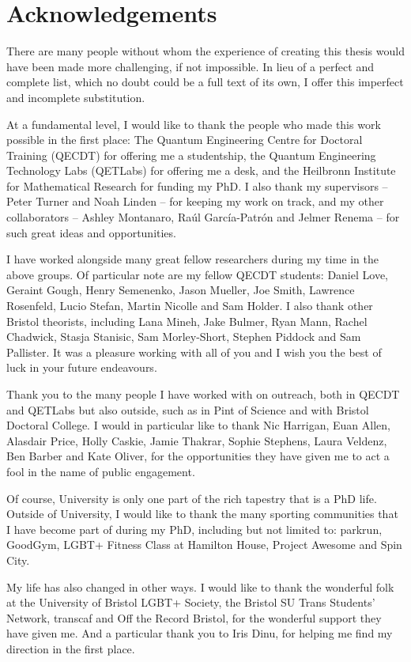 \chapter*{Acknowledgements}

There are many people without whom the experience of creating this thesis would have been made more challenging, if not impossible. In lieu of a perfect and complete list, which no doubt could be a full text of its own, I offer this imperfect and incomplete substitution.

At a fundamental level, I would like to thank the people who made this work possible in the first place: The Quantum Engineering Centre for Doctoral Training (QECDT) for offering me a studentship, the Quantum Engineering Technology Labs (QETLabs) for offering me a desk, and the Heilbronn Institute for Mathematical Research for funding my PhD. I also thank my supervisors -- Peter Turner and Noah Linden -- for keeping my work on track, and my other collaborators -- Ashley Montanaro, Ra\'{u}l Garc\'{i}a-Patr\'{o}n and Jelmer Renema -- for such great ideas and opportunities.

I have worked alongside many great fellow researchers during my time in the above groups. Of particular note are my fellow QECDT students: Daniel Love, Geraint Gough, Henry Semenenko, Jason Mueller, Joe Smith, Lawrence Rosenfeld, Lucio Stefan, Martin Nicolle and Sam Holder. I also thank other Bristol theorists, including Lana Mineh, Jake Bulmer, Ryan Mann, Rachel Chadwick, Stasja Stanisic, Sam Morley-Short, Stephen Piddock and Sam Pallister. It was a pleasure working with all of you and I wish you the best of luck in your future endeavours.

Thank you to the many people I have worked with on outreach, both in QECDT and QETLabs but also outside, such as in Pint of Science and with Bristol Doctoral College. I would in particular like to thank Nic Harrigan, Euan Allen, Alasdair Price, Holly Caskie, Jamie Thakrar, Sophie Stephens, Laura Veldenz, Ben Barber and Kate Oliver, for the opportunities they have given me to act a fool in the name of public engagement.

Of course, University is only one part of the rich tapestry that is a PhD life. Outside of University, I would like to thank the many sporting communities that I have become part of during my PhD, including but not limited to: parkrun, GoodGym, LGBT+ Fitness Class at Hamilton House, Project Awesome and Spin City.

My life has also changed in other ways. I would like to thank the wonderful folk at the University of Bristol LGBT+ Society, the Bristol SU Trans Students' Network, transcaf and Off the Record Bristol, for the wonderful support they have given me. And a particular thank you to Iris Dinu, for helping me find my direction in the first place.

